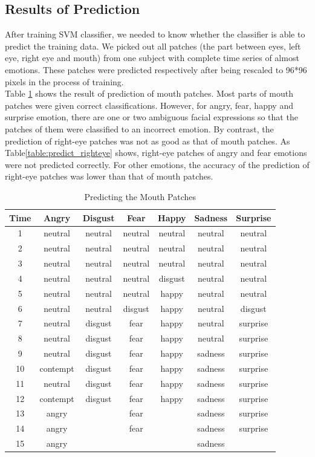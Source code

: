 \subsection{Results of Prediction}
After training SVM classifier, we needed to know whether the classifier is able to predict the training data. We picked out all patches (the part between eyes, left eye, right eye and mouth) from one subject with complete time series of almost emotions. These patches were predicted respectively after being rescaled to 96*96 pixels in the process of training. 
\\

Table \ref{table:predict_mouth} shows the result of prediction of mouth patches. Most parts of mouth patches were given correct classifications. However, for angry, fear, happy and surprise emotion, there are one or two ambiguous facial expressions so that the patches of them were classified to an incorrect emotion. By contrast, the prediction of right-eye patches was not as good as that of mouth patches. As Table\ref{table:predict_righteye} shows, right-eye patches of angry and fear emotions were not predicted correctly. For other emotions, the accuracy of the prediction of right-eye patches was lower than that of mouth patches.

\begin{table}
\caption{Predicting the Mouth Patches}
\label{table:predict_mouth}

\begin{tabular}{| c | c | c | c | c | c | c |}
\hline
Time & Angry &  Disgust  & Fear & Happy & Sadness & Surprise  \\
\hline
1 & neutral & neutral & neutral & neutral & neutral & neutral \\
2 & neutral & neutral & neutral & neutral & neutral & neutral \\
3 & neutral & neutral & neutral & neutral & neutral & neutral \\
4 & neutral & neutral & neutral & disgust & neutral & neutral \\
5 & neutral & neutral & neutral & happy & neutral & neutral \\
6 & neutral & neutral & disgust & happy & neutral & disgust \\
7 & neutral & disgust & fear & happy & neutral & surprise \\
8 & neutral & disgust & fear & happy & neutral & surprise \\
9 & neutral & disgust & fear & happy & sadness & surprise \\
10 & contempt & disgust & fear & happy & sadness & surprise \\
11 & neutral & disgust & fear & happy & sadness & surprise \\
12 & contempt & disgust & fear & happy & sadness & surprise \\
13 & angry &  & fear &  & sadness & surprise \\
14 & angry &  & fear &  & sadness & surprise \\
15 & angry &  &  &  & sadness & \\

\hline
\end{tabular}
\end{table}


